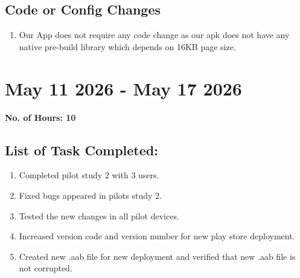 \documentclass[12pt]{article}
\begin{document}
\subsection{Code or Config Changes}
\begin{enumerate}
    \item Our App does not require any code change as our apk does not have any native pre-build library which depends on 16KB page size.
\end{enumerate}
\section{May 11 2026  - May 17 2026}
{\bf No. of Hours: 10}
\subsection{List of Task Completed:}
\begin{enumerate}
    \item Completed pilot study 2 with 3 users.
    \item Fixed bugs appeared in pilots study 2.
    \item Tested the new changes in all pilot devices.
    \item Increased version code and version number for new play store deployment.
    \item Created new .aab file for new deployment and verified that new .aab file is not corrupted.
\end{enumerate}
\clearpage


\end{document}
